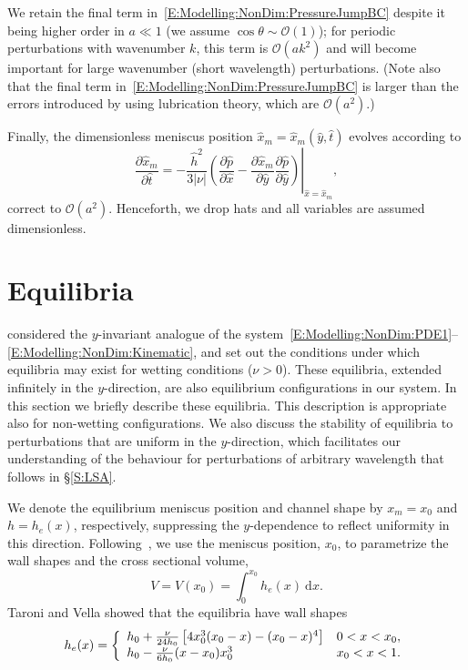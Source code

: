 \documentclass{jfm}
\newcommand{\ddp}[2]{\frac{\partial #1}{\partial #2}}
\newcommand{\aspect}{a} %
\newcommand{\h}{h}
\newcommand{\x}{x}
\begin{document}
We retain the final term in~\eqref{E:Modelling:NonDim:PressureJumpBC} despite it being higher order in $\aspect \ll 1$ (we assume $\cos \theta \sim \mathcal{O}(1)$); for periodic perturbations with wavenumber $k$, this term is $\mathcal{O}(\aspect k^2)$ and will become important for large wavenumber (short wavelength) perturbations. (Note also that the final term in~\eqref{E:Modelling:NonDim:PressureJumpBC} is larger than the errors introduced by using lubrication theory, which are $\mathcal{O}(\aspect^2)$.)

Finally, the dimensionless meniscus position $\hat{x}_m = \hat{x}_m(\hat{y}, \hat{t})$ evolves according to
\begin{equation}\label{E:Modelling:NonDim:Kinematic}
\ddp{ \hat{x} _m}{\hat{t}} = -\left.\frac{\hat{h}^2}{3|\nu|}\left(\ddp{\hat{p}}{\hat{x}} - \ddp{\hat{x}_m}{\hat{y}}\ddp{\hat{p}}{\hat{y}} \right)  \right|_{\hat{x} = \hat{x}_m},
\end{equation}
correct to $\mathcal{O}(\aspect^2)$. Henceforth, we drop hats and all variables are assumed dimensionless. 


\section{Equilibria}\label{S:Equilibria}
\citet{Taroni2012JFM} considered the $y$-invariant analogue of the system~\eqref{E:Modelling:NonDim:PDE1}--\eqref{E:Modelling:NonDim:Kinematic}, and set out the conditions under which equilibria may exist for wetting conditions ($\nu > 0$). These equilibria, extended infinitely in the $y$-direction, are also equilibrium configurations in our system. In this section we briefly describe these equilibria. This description is appropriate also for non-wetting configurations. We also discuss the stability of equilibria to perturbations that are uniform in  the $y$-direction, which facilitates our understanding of the behaviour for perturbations of arbitrary wavelength that follows in \S\ref{S:LSA}. 

We denote the equilibrium meniscus position and channel shape by $x_m = x_0$ and $h = h_e(x)$, respectively, suppressing the $y$-dependence to reflect uniformity in this direction. Following~\citet{Taroni2012JFM}, we use the meniscus position, $x_0$, to parametrize the wall shapes and the cross sectional volume,
\begin{equation}\label{E:Equilibria:Volume}
V  = V(x_0) = \int_{0}^{x_0} h_e(x)~\mathrm{d}x.
\end{equation}
Taroni and Vella showed that the equilibria have wall shapes
\begin{equation}\label{E:Equilibria:EqShape}
\h_e(\x) = \left\{\begin{array}{l l}
 \h_0+ \frac{\nu}{24 \h_0}\left[4 x_0^3( \x_0 - \x) - ( \x_0 - \x)^4\right] &  0 < \x <  \x_0, \\
 \h_0 -\frac{\nu }{6 h_0}(\x - \x_0) \x_0^3 & \x_0 < \x < 1.
\end{array}\right.
\end{equation}
\end{document}
